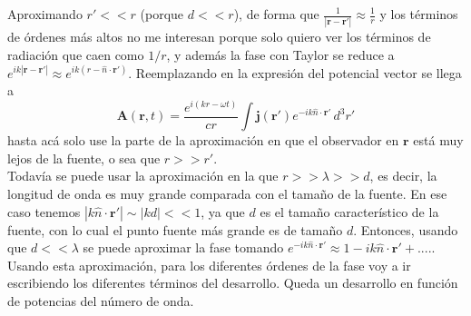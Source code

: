 \indent Aproximando $r' << r$ (porque $d << r$), de forma que $\frac{1}{|\textbf{r}-\textbf{r}'|} \approx \frac{1}{r}$ y los términos de órdenes más altos no me interesan porque solo quiero ver los términos de radiación que caen como $1/r$, y además la fase con Taylor se reduce a $e^{ik|\textbf{r}-\textbf{r}'|} \approx e^{ik(r - \hat{n}\cdot \textbf{r}')}$. Reemplazando en la expresión del potencial vector se llega a
\begin{equation}
    \textbf{A}(\textbf{r},t) = 
    \frac{e^{i(kr - \omega t)}}{cr}
    \int \textbf{j}(\textbf{r}') e^{-ik\hat{n}\cdot \textbf{r}'}\,
    d^{3}r'
        \label{ec:PotencialVectorRadiacion}
\end{equation}
hasta acá solo use la parte de la aproximación en que el observador en $\textbf{r}$ está muy lejos de la fuente, o sea que $r >> r'$.\\ \indent Todavía se puede usar la aproximación en la que $r >>\lambda >> d$, es decir, la longitud de onda es muy grande comparada con el tamaño de la fuente. En ese caso tenemos $|k\hat{n}\cdot \textbf{r}'|\sim |kd| << 1$, ya que $d$ es el tamaño característico de la fuente, con lo cual el punto fuente más grande es de tamaño $d$. Entonces, usando que $d << \lambda$ se puede aproximar la fase tomando $e^{-ik\hat{n}\cdot \textbf{r}'} \approx 1 - i k\hat{n} \cdot \textbf{r}' + ....$. Usando esta aproximación, para los diferentes órdenes de la fase voy a ir escribiendo los diferentes términos del desarrollo. Queda un desarrollo en función de potencias del número de onda.
